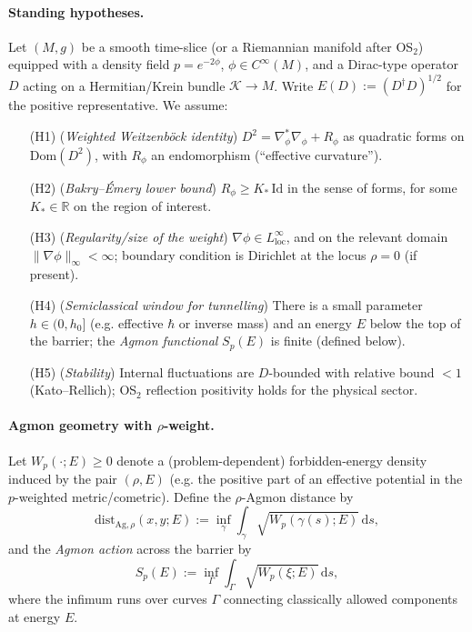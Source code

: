 \documentclass[11pt]{article}
\theoremstyle{definition}
\begin{document}
	\paragraph{Standing hypotheses.}
	Let $(M,g)$ be a smooth time-slice (or a Riemannian manifold after OS$_2$) equipped with a density field $p = e^{-2\phi}$, $\phi\in C^\infty(M)$, and a Dirac-type operator $D$ acting on a Hermitian/Krein bundle $\mathcal{K}\to M$.
	Write $E(D):=(D^\dagger D)^{1/2}$ for the positive representative.
	We assume:
	\begin{itemize}
		\item[(H1)] (\emph{Weighted Weitzenböck identity}) $D^2=\nabla_\phi^\ast\nabla_\phi+R_\phi$ as quadratic forms on $\mathrm{Dom}(D^2)$, with $R_\phi$ an endomorphism (``effective curvature'').
		\item[(H2)] (\emph{Bakry--Émery lower bound}) $R_\phi \ge K_\ast\,\mathrm{Id}$ in the sense of forms, for some $K_\ast\in\mathbb{R}$ on the region of interest.
		\item[(H3)] (\emph{Regularity/size of the weight}) $\nabla\phi\in L^\infty_{\mathrm{loc}}$, and on the relevant domain $\|\nabla\phi\|_\infty<\infty$; boundary condition is Dirichlet at the locus $\rho=0$ (if present).
		\item[(H4)] (\emph{Semiclassical window for tunnelling}) There is a small parameter $h\in(0,h_0]$ (e.g. effective $\hbar$ or inverse mass) and an energy $E$ below the top of the barrier; the \emph{Agmon functional} $S_p(E)$ is finite (defined below).
		\item[(H5)] (\emph{Stability}) Internal fluctuations are $D$-bounded with relative bound $<1$ (Kato--Rellich); OS$_2$ reflection positivity holds for the physical sector.
	\end{itemize}
	
	\paragraph{Agmon geometry with $\rho$-weight.}
	Let $W_p(\cdot;E)\ge 0$ denote a (problem-dependent) forbidden-energy density induced by the pair $(\rho,E)$
	(e.g. the positive part of an effective potential in the $p$-weighted metric/cometric).
	Define the $\rho$-Agmon distance by
	\[
	\mathrm{dist}_{\mathrm{Ag},\rho}(x,y;E)
	:= \inf_{\gamma}\int_\gamma \sqrt{W_p(\gamma(s);E)}\,\mathrm{d}s,
	\]
	and the \emph{Agmon action} across the barrier by
	\[
	S_p(E):=\inf_{\Gamma}\int_{\Gamma}\sqrt{W_p(\xi;E)}\,\mathrm{d}s,
	\]
	where the infimum runs over curves $\Gamma$ connecting classically allowed components at energy $E$.
	
\end{document}
